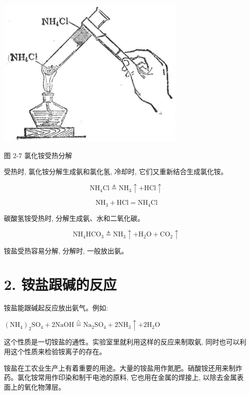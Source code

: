 \documentclass[10pt]{article}
\begin{document}
\begin{center}
\includegraphics[max width=0.7\textwidth]{images/01912d13-9986-7822-a012-3f3f7be99dcb_46_347795.jpg}
\end{center}

图 2-7 氯化铵受热分解

受热时, 氯化铵分解生成氨和氯化氢, 冷却时, 它们又重新结合生成氯化铵。

\[
{\mathrm{{NH}}}_{4}\mathrm{{Cl}} \triangleq {\mathrm{{NH}}}_{3} \uparrow + \mathrm{{HCl}} \uparrow
\]

\[
{\mathrm{{NH}}}_{3} + \mathrm{{HCl}} = {\mathrm{{NH}}}_{4}\mathrm{{Cl}}
\]

碳酸氢铵受热时, 分解生成氨、水和二氧化碳。

\[
{\mathrm{{NH}}}_{4}{\mathrm{{HCO}}}_{3} \triangleq {\mathrm{{NH}}}_{3} \uparrow + {\mathrm{H}}_{2}\mathrm{O} + {\mathrm{{CO}}}_{2} \uparrow
\]

铵盐受热容易分解, 分解时, 一般放出氨。

\section*{2. 铵盐跟碱的反应}

铵盐能跟碱起反应放出氨气。例如:

\({\left( {\mathrm{{NH}}}_{4}\right) }_{2}{\mathrm{{SO}}}_{4} + 2\mathrm{{NaOH}}\overset{\bigtriangleup }{ = }{\mathrm{{Na}}}_{2}{\mathrm{{SO}}}_{4} + 2{\mathrm{{NH}}}_{3} \uparrow + 2{\mathrm{H}}_{2}\mathrm{O}\)

这个性质是一切铵盐的通性。实验室里就利用这样的反应来制取氨, 同时也可以利用这个性质来检验铵离子的存在。

铵盐在工农业生产上有着重要的用途。大量的铵盐用作氮肥。硝酸铵还用来制炸药。氯化铵常用作印染和制干电池的原料, 它也用在金属的焊接上, 以除去金属表面上的氧化物薄层。
\end{document}
